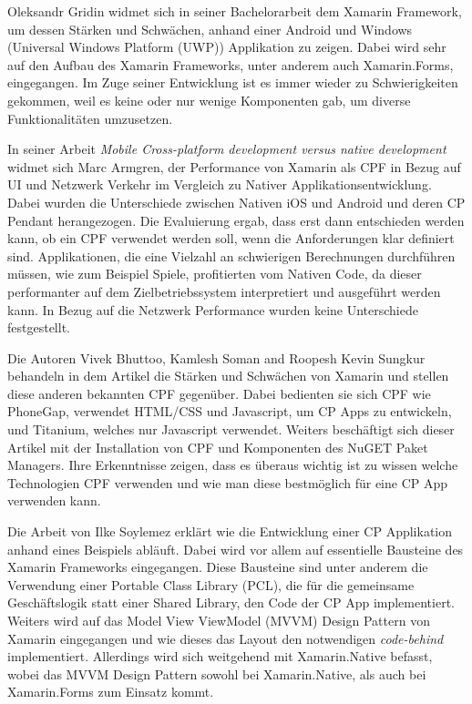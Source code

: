 Oleksandr Gridin widmet sich in seiner Bachelorarbeit \cite{Oleksandr2015} dem Xamarin Framework, um dessen Stärken und Schwächen, anhand einer Android und Windows (Universal Windows Platform (UWP)) Applikation zu zeigen. Dabei wird sehr auf den Aufbau des Xamarin Frameworks, unter anderem auch Xamarin.Forms, eingegangen. Im Zuge seiner Entwicklung ist es immer wieder zu Schwierigkeiten gekommen, weil es keine oder nur wenige Komponenten gab, um diverse Funktionalitäten umzusetzen.

In seiner Arbeit \cite{Armgren852125} \textit{Mobile Cross-platform development versus native development} widmet sich Marc Armgren, der Performance von Xamarin als CPF in Bezug auf UI und Netzwerk Verkehr im Vergleich zu Nativer Applikationsentwicklung. Dabei wurden die Unterschiede zwischen Nativen iOS und Android und deren CP Pendant herangezogen. Die Evaluierung ergab, dass erst dann entschieden werden kann, ob ein CPF verwendet werden soll, wenn die Anforderungen klar definiert sind. Applikationen, die eine Vielzahl an schwierigen Berechnungen durchführen müssen, wie zum Beispiel Spiele, profitierten vom Nativen Code, da dieser performanter auf dem Zielbetriebssystem interpretiert und ausgeführt werden kann. In Bezug auf die Netzwerk Performance wurden keine Unterschiede festgestellt. 

Die Autoren Vivek Bhuttoo, Kamlesh Soman and Roopesh Kevin Sungkur behandeln in dem Artikel \cite{8016193} die Stärken und Schwächen von Xamarin und stellen diese anderen bekannten CPF gegenüber. Dabei bedienten sie sich CPF wie PhoneGap, verwendet HTML/CSS und Javascript, um CP Apps zu entwickeln, und Titanium, welches nur Javascript verwendet. Weiters beschäftigt sich dieser Artikel mit der Installation von CPF und Komponenten des NuGET Paket Managers. Ihre Erkenntnisse zeigen, dass es überaus wichtig ist zu wissen welche Technologien CPF verwenden und wie man diese bestmöglich für eine CP App verwenden kann.

Die Arbeit von Ilke Soylemez \cite{Mukesh2016} erklärt wie die Entwicklung einer CP Applikation anhand eines Beispiels abläuft. Dabei wird vor allem auf essentielle Bausteine des Xamarin Frameworks eingegangen. Diese Bausteine sind unter anderem die Verwendung einer Portable Class Library (PCL), die für die gemeinsame Geschäftslogik statt einer Shared Library, den Code der CP App implementiert. Weiters wird auf das Model View ViewModel (MVVM) Design Pattern von Xamarin eingegangen und wie dieses das Layout den notwendigen \textit{code-behind} implementiert. Allerdings wird sich weitgehend mit Xamarin.Native befasst, wobei das MVVM Design Pattern sowohl bei Xamarin.Native, als auch bei Xamarin.Forms zum Einsatz kommt.

